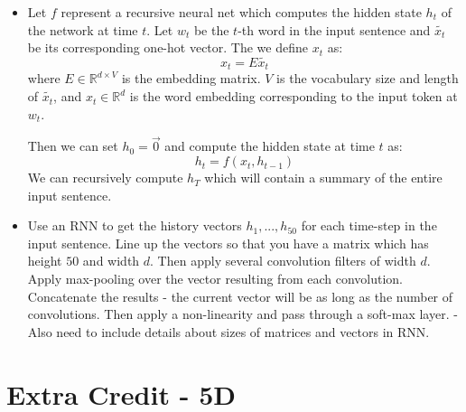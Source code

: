 \documentclass[a4paper]{article}
\begin{document}
\begin{itemize}

\item{Let $f$ represent a recursive neural net which computes the hidden state $h_t$ of the network at time $t$. Let $w_t$ be the $t$-th word in the input sentence and $\tilde{x_t}$ be its corresponding one-hot vector. The we define $x_t$ as:
$$x_t = E \tilde{x_t} $$
where $E \in \mathbb{R}^{d \times V}$ is the embedding matrix. $V$ is the vocabulary size and length of $\tilde{x_t}$, and $x_t \in \mathbb{R}^d$ is the word embedding corresponding to the input token at $w_t$. 

Then we can set $h_0 = \vec{0}$ and compute the hidden state at time $t$ as:
$$h_t = f(x_t, h_{t-1}) $$ 
We can recursively compute $h_T$ which will contain a summary of the entire input sentence. }

\item{Use an RNN to get the history vectors $h_1,...,h_{50}$ for each time-step in the input sentence. Line up the vectors so that you have a matrix which has height $50$ and width $d$. Then apply several convolution filters of width $d$. Apply max-pooling over the vector resulting from each convolution. Concatenate the results - the current vector will be as long as the number of convolutions. Then apply a non-linearity and pass through a soft-max layer. - Also need to include details about sizes of matrices and vectors in RNN.

}

\end{itemize}

\section*{Extra Credit - 5D}
\end{document}
